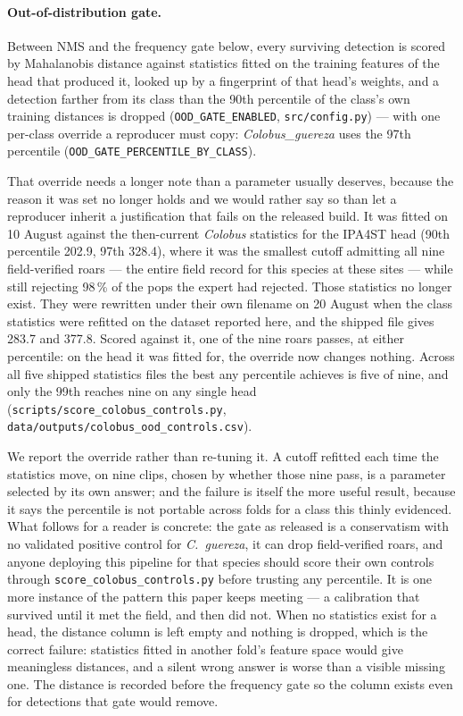 \documentclass[review,3p,times]{elsarticle}
\begin{document}
\paragraph{Out-of-distribution gate.} Between NMS and the frequency gate
below, every surviving detection is scored by Mahalanobis distance against
statistics fitted on the training features of the head that produced it,
looked up by a fingerprint of that head's weights, and a detection farther
from its class than the 90th percentile of the class's own training distances
is dropped (\texttt{OOD\_GATE\_ENABLED}, \texttt{src/config.py}) --- with one
per-class override a reproducer must copy: \textit{Colobus\_guereza} uses the
97th percentile (\texttt{OOD\_GATE\_PERCENTILE\_BY\_CLASS}).

That override needs a longer note than a parameter usually deserves, because
the reason it was set no longer holds and we would rather say so than let a
reproducer inherit a justification that fails on the released build. It was
fitted on 10 August against the then-current \textit{Colobus} statistics for
the IPA4ST head (90th percentile 202.9, 97th 328.4), where it was the smallest
cutoff admitting all nine field-verified roars --- the entire field record for
this species at these sites --- while still rejecting 98\,\% of the pops the
expert had rejected. Those statistics no longer exist. They were rewritten
under their own filename on 20 August when the class statistics were refitted
on the dataset reported here, and the shipped file gives 283.7 and 377.8.
Scored against it, one of the nine roars passes, at either percentile: on the
head it was fitted for, the override now changes nothing. Across all five
shipped statistics files the best any percentile achieves is five of nine, and
only the 99th reaches nine on any single head
(\texttt{scripts/score\_colobus\_controls.py},
\texttt{data/outputs/colobus\_ood\_controls.csv}).

We report the override rather than re-tuning it. A cutoff refitted each time
the statistics move, on nine clips, chosen by whether those nine pass, is a
parameter selected by its own answer; and the failure is itself the more useful
result, because it says the percentile is not portable across folds for a class
this thinly evidenced. What follows for a reader is concrete: the gate as
released is a conservatism with no validated positive control for
\textit{C.\ guereza}, it can drop field-verified roars, and anyone deploying
this pipeline for that species should score their own controls through
\texttt{score\_colobus\_controls.py} before trusting any percentile. It is one
more instance of the pattern this paper keeps meeting --- a calibration that
survived until it met the field, and then did not. When no
statistics exist for a head, the distance column is left empty and nothing is
dropped, which is the correct failure: statistics fitted in another fold's
feature space would give meaningless distances, and a silent wrong answer is
worse than a visible missing one. The distance is recorded before the
frequency gate so the column exists even for detections that gate would
remove.
\end{document}
